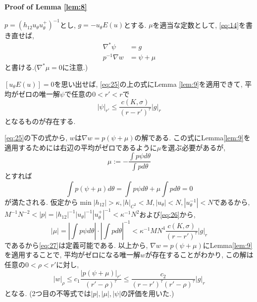 \documentclass[a4paper]{ujarticle}
\makeatletter
\numberwithin{equation}{section}
\theoremstyle{definition}
\renewenvironment{proof}[1][Proof]{\par
  \pushQED{\qed}%
  \normalfont \topsep6\p@\@plus6\p@\relax
  \trivlist
  \item\relax
  {\bfseries
  #1\@addpunct{.}}\hspace\labelsep\ignorespaces
}{%
  \popQED\endtrivlist\@endpefalse
}
\makeatother
\begin{document}
        \begin{proof}[Proof of Lemma \ref{lem:8}]
            $p = (h_{12} u_{\theta} u_{\theta}^{+})^{-1}$とし, $g = - u_{\theta} E(u)$とする. $\mu$を適当な定数として, \eqref{eq:14}を書き直せば, 
            \begin{equation} \label{eq:25}
                \begin{aligned}
                    \nabla^{*} \psi &= g \\
                    p^{-1} \nabla w &= \psi + \mu
                \end{aligned}
            \end{equation}
            と書ける.($\nabla^{*}\mu = 0$に注意.)

            $[u_{\theta} E(u)] = 0$を思い出せば, \eqref{eq:25}の上の式にLemma \ref{lem:9}を適用できて,
            平均がゼロの唯一解$\psi$で任意の$0 < r' < r$で
            \begin{equation} \label{eq:26}
                |\psi|_{r'} \leq \frac{c(K, \sigma)}{(r - r')^{\tau}} |g|_{r}
            \end{equation}
            となるものが存在する.

            \eqref{eq:25}の下の式から, $w$は$\nabla w = p(\psi + \mu)$の解である.
            この式にLemma\ref{lem:9}を適用するためには右辺の平均がゼロであるように$\mu$を選ぶ必要があるが,
            \begin{equation} \label{eq:27}
                \mu := - \frac{\int p \psi d \theta}{\int p d \theta}
            \end{equation}
            とすれば
            \[
                \int p(\psi + \mu) d \theta = \int p \psi d \theta + \mu \int p d \theta = 0
            \]
            が満たされる.  仮定から$\min |h_{12}| > \kappa, |h|_{C^2} < M, |u_{\theta}| < N, |u_{\theta}^{-1}| < N$であるから,
            $M^{-1} N^{-2} < |p| = |h_{12}|^{-1} |u_{\theta}|^{-1} |u_{\theta}^{+}|^{-1} < \kappa^{-1} N^2$および\eqref{eq:26}から,
            \[
                |\mu| = \left|\int p \psi d \theta\right| \cdot \left|\int p d \theta\right|^{-1} < \kappa^{-1} M N^4\frac{c(K, \sigma)}{(r - r')^{\tau}} |g|_{r}
            \]
            であるから\eqref{eq:27}は定義可能である.
            以上から, $\nabla w = p(\psi + \mu)$にLemma\ref{lem:9}を適用することで, 
            平均がゼロになる唯一解$w$が存在することがわかり, この解は任意の$0 < \rho < r'$に対し, 
            \[
                |w|_{\rho} \leq c_1\frac{|p(\psi + \mu)|_{r'}}{(r' - \rho)^{\tau}} \leq \frac{c_2}{(r - r')^{\tau} (r' - \rho)^{\tau}}|g|_{r}
            \]
            となる. (2つ目の不等式では$|p|, |\mu|, |\psi|$の評価を用いた.)


\end{proof}
\end{document}
